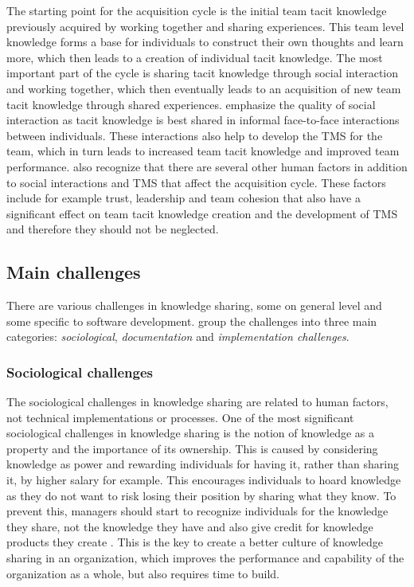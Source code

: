 The starting point for the acquisition cycle is the initial team tacit knowledge previously acquired by working together and sharing
experiences. This team level knowledge forms a base for individuals to construct their own thoughts and learn more, which then leads to a creation of individual tacit
knowledge. The most important part of the cycle is sharing tacit knowledge through social interaction and working together, which then eventually leads to an acquisition
of new team tacit knowledge through shared experiences. \citet{Ryan2013} emphasize the quality of social interaction as tacit knowledge is best shared in informal
face-to-face interactions between individuals. These interactions also help to develop the TMS for the team, which in turn leads to increased team tacit knowledge and
improved team performance. \citet{Ryan2013} also recognize that there are several other human factors in addition to social interactions and TMS that affect
the acquisition cycle. These factors include for example trust, leadership and team cohesion that also have a significant effect on team tacit knowledge creation
and the development of TMS and therefore they should not be neglected.

\subsection{Main challenges}
\label{section:barriers}

There are various challenges in knowledge sharing, some on general level and some specific to software development. \citet{Ersoy2015} group the challenges into three
main categories: \emph{sociological}, \emph{documentation} and \emph{implementation challenges}.

\subsubsection*{Sociological challenges}
The sociological challenges in knowledge sharing are related to human factors, not technical implementations or processes. One of the most significant sociological
challenges in knowledge sharing is the notion of knowledge as a property and the importance of its ownership. This is caused by considering
knowledge as power and rewarding individuals for having it, rather than sharing it, by higher salary for example. This encourages individuals to hoard
knowledge as they do not want to risk losing their position by sharing what they know. To prevent this, managers should start to recognize individuals for the
knowledge they share, not the knowledge they have and also give credit for knowledge products they create \citep{Dalkir2013}. This is the key to create a better
culture of knowledge sharing in an organization, which improves the performance and capability of the organization as a whole, but also requires
time to build.


